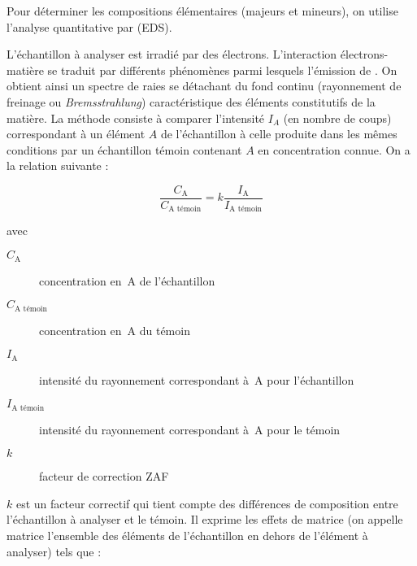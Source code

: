 Pour déterminer les compositions élémentaires (majeurs et mineurs), 
on utilise l'analyse quantitative par \EDS (EDS).

L'échantillon à analyser est irradié par des électrons. L'interaction 
électrons-matière se traduit par différents phénomènes parmi lesquels 
l'émission de \RX. On obtient ainsi un spectre de raies se détachant 
du fond continu (rayonnement de freinage ou \emph{Bremsstrahlung}) 
caractéristique des éléments constitutifs de la matière. La méthode 
consiste à comparer l'intensité $I_A$ (en nombre de coups) 
correspondant à un élément $A$ de l'échantillon à celle produite 
dans les mêmes conditions par un échantillon témoin contenant $A$ 
en concentration connue. On a la relation suivante :

\begin{equation*}
  \frac{C_\text{A}}{C_\text{A témoin}} = 
                      k \frac{I_\text{A}}{I_\text{A témoin}}
\end{equation*}


avec%
\begin{description}
  \item [$C_\text{A}$] concentration en~A de l'échantillon
  \item [$C_\text{A témoin}$] concentration en~A du témoin
  \item [$I_\text{A}$] intensité du rayonnement correspondant à~A pour 
        l'échantillon
  \item [$I_\text{A témoin}$] intensité du rayonnement correspondant 
        à~A pour le témoin
  \item [$k$] facteur de correction ZAF
\end{description}

$k$ est un facteur correctif qui tient compte des différences de 
composition entre l'échantillon à analyser et le témoin. Il exprime 
les effets de matrice (on appelle matrice l'ensemble des éléments de 
l'échantillon en dehors de l'élément à analyser) tels que :

